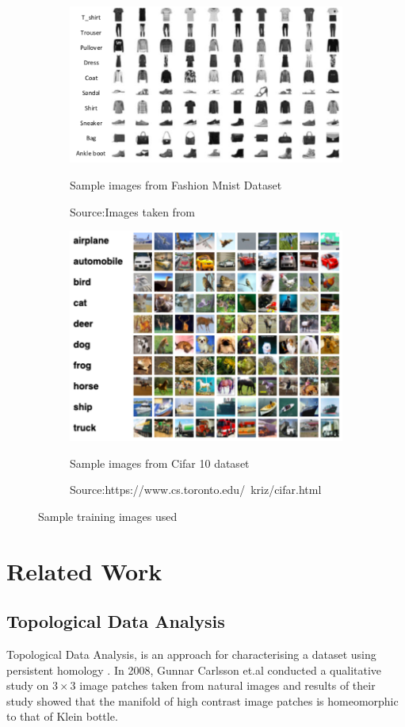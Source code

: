 \documentclass{bmvc2k}
\begin{document}
\begin{figure}[t!]
\begin{subfigure}{.5\textwidth}
  \centering
  \includegraphics[width=.8\linewidth]{DogCat/fashionmnist.png}
  \caption{Sample images from Fashion Mnist Dataset}
  \caption*{Source:Images taken from \cite{xiao2017fashion}}

  \label{fashionmnist}
\end{subfigure}
\begin{subfigure}{.5\textwidth}
  \centering
  \includegraphics[width=.7\linewidth]{DogCat/Cifar10.png}
  \caption{Sample images from Cifar 10 dataset}
  \caption*{Source:https://www.cs.toronto.edu/~kriz/cifar.html}
  \label{cifar10}
\end{subfigure}
\vspace{.1in}
\caption{Sample training images used}

\label{Sample training images used}
\end{figure}
\section{Related Work}
\subsection{Topological Data Analysis}
Topological Data Analysis\cite{chazal2017introduction}\cite{smith2021topological}, is an approach for characterising a dataset using persistent homology \cite{edelsbrunner2008persistent}.
In 2008, Gunnar Carlsson et.al \cite{carlsson2008local} conducted a qualitative study on  $3\times3$ image patches taken from natural images and  results of their study showed that the manifold of  high contrast image patches is homeomorphic to that of Klein bottle.
\end{document}
